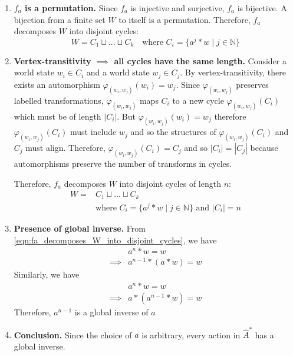 \begin{proofE}
\begin{enumerate}
    \item \textbf{$f_{a}$ is a permutation.}
    Since $f_{a}$ is injective and surjective, $f_{a}$ is bijective.
    A bijection from a finite set $W$ to itself is a permutation.
    Therefore, $f_{a}$ decomposes $W$ into disjoint cycles:
    \begin{equation}
        W = C_{1} \sqcup ... \sqcup C_{k} \quad \text{where } C_{i} = \{a^{j} \ast w \mid j \in \mathbb{N}\}
    \end{equation}

    \item \textbf{Vertex-transitivity $\implies$ all cycles have the same length.}
    Consider a world state $w_{i} \in C_{i}$ and a world state $w_{j} \in C_{j}$.
    By vertex-transitivity, there exists an automorphism $\varphi_{(w_{i}, w_{j})}(w_{i}) = w_{j}$.
    Since $\varphi_{(w_{i}, w_{j})}$ preserves labelled transformations, $\varphi_{(w_{i}, w_{j})}$ maps $C_{i}$ to a new cycle $\varphi_{(w_{i}, w_{j})}(C_{i})$ which must be of length $|C_{i}|$.
    But $\varphi_{(w_{i}, w_{j})}(w_{i}) = w_{j}$ therefore $\varphi_{(w_{i}, w_{j})}(C_{i})$ must include $w_{j}$ and so the structures of $\varphi_{(w_{i}, w_{j})}(C_{i})$ and $C_{j}$ must align.
    Therefore, $\varphi_{(w_{i}, w_{j})}(C_{i}) = C_{j}$ and so $|C_{i}| = |C_{j}|$ because automorphisms preserve the number of transforms in cycles.

    Therefore, $f_{a}$ decomposes $W$ into disjoint cycles of length $n$:
    \begin{equation}\label{eqn:fa_decomposes_W_into_disjoint_cycles}
    \begin{aligned}
        W = & C_{1} \sqcup ... \sqcup C_{k} \\
        & \text{where } C_{i} = \{a^{j} \ast w \mid j \in \mathbb{N}\} \text{ and } |C_{i}| = n
    \end{aligned}
    \end{equation}

    \item \textbf{Presence of global inverse.}
    From \cref{eqn:fa_decomposes_W_into_disjoint_cycles}, we have
    \begin{align}
        & a^{n} \ast w = w \\
        \implies & a^{n-1} \ast (a \ast w) = w
    \end{align}
    Similarly, we have
    \begin{align}
        & a^{n} \ast w = w \\
        \implies & a \ast (a^{n-1} \ast w) = w
    \end{align}
    Therefore, $a^{n-1}$ is a global inverse of $a$

    \item \textbf{Conclusion.}
    Since the choice of $a$ is arbitrary, every action in $\hat{A}^{*}$ has a global inverse.
\end{enumerate}
\end{proofE}


